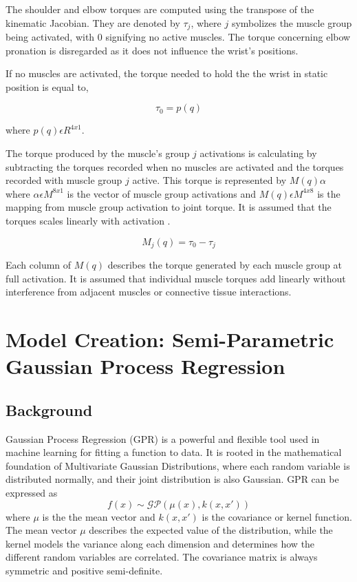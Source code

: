 The shoulder and elbow torques are computed using the transpose of the kinematic Jacobian. They are denoted by $\tau_{j}$, where $j$ symbolizes the muscle group being activated, with 0 signifying no active muscles. The torque concerning elbow pronation is disregarded as it does not influence the wrist's positions. 

If no muscles are activated, the torque needed to hold the the wrist in static position is equal to,

\begin{equation}
\tau_0 = p(q)
\end{equation}

where $p(q) \epsilon  R^{4x1}$. 

The torque produced by the muscle's group $j$ activations is calculating by subtracting the torques recorded when no muscles are activated and the torques recorded with muscle group $j$ active. This torque  is represented by $M(q)\alpha$ where $\alpha \epsilon M^{8x1}$ is the vector of muscle group activations and $M(q) \epsilon M^{4x8}$ is the mapping from muscle group activation to joint torque. It is assumed that the torques scales linearly with activation \cite{SPI}. 

\begin{equation} \label{eq:MAP}
    M_j(q) = \tau_0 - \tau_j
\end{equation}

Each column of $M(q)$ describes the torque generated by each muscle group at full activation. It is assumed that individual muscle torques add linearly without interference from adjacent muscles or connective tissue interactions. 




\newpage
\section{Model Creation: Semi-Parametric Gaussian Process Regression} \label{sec:spgp}

\subsection{Background}

Gaussian Process Regression (GPR) is a powerful and flexible tool used in machine learning for fitting a function to data. It is rooted in the mathematical foundation of Multivariate Gaussian Distributions, where each random variable is distributed normally, and their joint distribution is also Gaussian. GPR can be expressed as 
\begin{equation}
    f(x) \sim \mathcal{GP}(\mu(x), k(x, x'))
\end{equation}
where  \( \mu \) is the the mean vector and \( k(x, x') \) is the covariance or kernel function. The mean vector \( \mu \) describes the expected value of the distribution, while the kernel models the variance along each dimension and determines how the different random variables are correlated. The covariance matrix is always symmetric and positive semi-definite.

